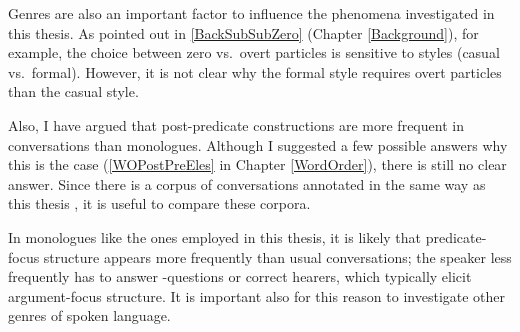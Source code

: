 Genres are also an important factor to influence the phenomena investigated in this thesis.
As pointed out in \ref{BackSubSubZero} (Chapter \ref{Background}),
for example,
the choice between zero vs.~overt particles is sensitive to
styles (casual vs.~formal).
However, it is not clear why the formal style requires overt particles than
the casual style.

Also, I have argued that
post-predicate constructions are more frequent in conversations than monologues.
Although I suggested a few possible answers why this is the case (\ref{WOPostPreEles} in Chapter \ref{WordOrder}),
there is still no clear answer.
Since there is a corpus of conversations annotated in the same way as this thesis \cite{nakagawaden12},
it is useful to compare these corpora.

In monologues like the ones employed in this thesis,
it is likely that predicate-focus structure appears more frequently than usual conversations;
 the speaker less frequently has to answer -questions or correct hearers, which typically elicit argument-focus structure.
It is important also for this reason to investigate other genres of spoken language.







